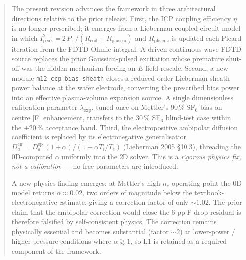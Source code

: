 \documentclass[11pt,a4paper]{report}
\begin{document}
\begin{abstract}
The present revision advances the framework in three architectural directions relative to the prior release. First, the ICP coupling efficiency $\eta$ is no longer prescribed; it emerges from a Lieberman coupled-circuit model in which $I_\mathrm{peak}^2 = 2\,P_\mathrm{rf}/(R_\mathrm{coil}+R_\mathrm{plasma})$ and $R_\mathrm{plasma}$ is updated each Picard iteration from the FDTD Ohmic integral.  A driven continuous-wave FDTD source replaces the prior Gaussian-pulsed excitation whose premature shut-off was the hidden mechanism forcing an $E$-field rescale.  Second, a new module \texttt{m12\_ccp\_bias\_sheath} closes a reduced-order Lieberman sheath power balance at the wafer electrode, converting the prescribed bias power into an effective plasma-volume expansion source.  A single dimensionless calibration parameter $\lambda_\mathrm{exp}$, tuned once on Mettler's 90\,\% SF$_6$ bias-on centre [F] enhancement, transfers to the 30\,\% SF$_6$ blind-test case within the $\pm 20\,\%$ acceptance band.  Third, the electropositive ambipolar diffusion coefficient is replaced by its electronegative generalisation $D_a^\mathrm{en} = D_a^\mathrm{ep}\,(1+\alpha)/(1+\alpha T_i/T_e)$ (Lieberman 2005 §10.3), threading the 0D-computed $\alpha$ uniformly into the 2D solver.  This is a \emph{rigorous physics fix, not a calibration} --- no free parameters are introduced.

A new physics finding emerges: at Mettler's high-$n_e$ operating point the 0D model returns $\alpha \approx 0.02$, two orders of magnitude below the textbook-electronegative estimate, giving a correction factor of only $\sim 1.02$.  The prior claim that the ambipolar correction would close the 6-pp F-drop residual is therefore falsified by self-consistent physics.  The correction remains physically essential and becomes substantial (factor ${\sim}2$) at lower-power / higher-pressure conditions where $\alpha \gtrsim 1$, so L1 is retained as a required component of the framework.


\end{abstract}
\end{document}
